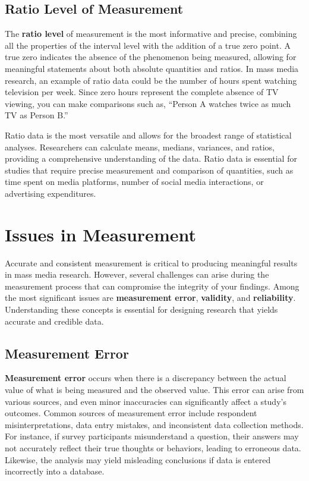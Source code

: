 \documentclass[
]{book}
\begin{document}
\subsection*{Ratio Level of Measurement}\label{ratio-level-of-measurement}

The \textbf{ratio level} of measurement is the most informative and precise, combining all the properties of the interval level with the addition of a true zero point. A true zero indicates the absence of the phenomenon being measured, allowing for meaningful statements about both absolute quantities and ratios. In mass media research, an example of ratio data could be the number of hours spent watching television per week. Since zero hours represent the complete absence of TV viewing, you can make comparisons such as, ``Person A watches twice as much TV as Person B.''

Ratio data is the most versatile and allows for the broadest range of statistical analyses. Researchers can calculate means, medians, variances, and ratios, providing a comprehensive understanding of the data. Ratio data is essential for studies that require precise measurement and comparison of quantities, such as time spent on media platforms, number of social media interactions, or advertising expenditures.

\section{Issues in Measurement}\label{issues-in-measurement}

Accurate and consistent measurement is critical to producing meaningful results in mass media research. However, several challenges can arise during the measurement process that can compromise the integrity of your findings. Among the most significant issues are \textbf{measurement error}, \textbf{validity}, and \textbf{reliability}. Understanding these concepts is essential for designing research that yields accurate and credible data.

\subsection*{Measurement Error}\label{measurement-error}

\textbf{Measurement error} occurs when there is a discrepancy between the actual value of what is being measured and the observed value. This error can arise from various sources, and even minor inaccuracies can significantly affect a study's outcomes. Common sources of measurement error include respondent misinterpretations, data entry mistakes, and inconsistent data collection methods. For instance, if survey participants misunderstand a question, their answers may not accurately reflect their true thoughts or behaviors, leading to erroneous data. Likewise, the analysis may yield misleading conclusions if data is entered incorrectly into a database.
\end{document}
